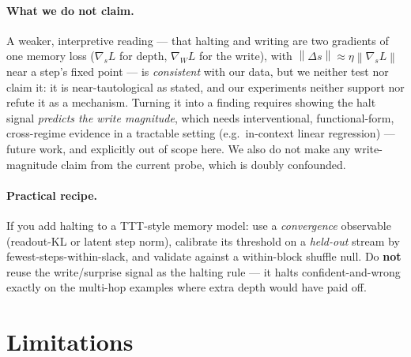 \documentclass{article}
\newcommand{\norm}[1]{\left\lVert #1 \right\rVert}
\begin{document}
\paragraph{What we do not claim.} A weaker, interpretive reading --- that
halting and writing are two gradients of one memory loss ($\nabla_s L$ for
depth, $\nabla_W L$ for the write), with $\norm{\Delta s} \approx \eta
\norm{\nabla_s L}$ near a step's fixed point --- is \emph{consistent} with our
data, but we neither test nor claim it: it is near-tautological as stated, and
our experiments neither support nor refute it as a mechanism. Turning it into a
finding requires showing the halt signal \emph{predicts the write magnitude},
which needs interventional, functional-form, cross-regime evidence in a
tractable setting (e.g.\ in-context linear regression) --- future work, and
explicitly out of scope here. We also do not make any write-magnitude claim
from the current probe, which is doubly confounded.

\paragraph{Practical recipe.} If you add halting to a TTT-style memory model:
use a \emph{convergence} observable (readout-KL or latent step norm), calibrate
its threshold on a \emph{held-out} stream by fewest-steps-within-slack, and
validate against a within-block shuffle null. Do \textbf{not} reuse the
write/surprise signal as the halting rule --- it halts confident-and-wrong
exactly on the multi-hop examples where extra depth would have paid off.

\section{Limitations}
\end{document}
